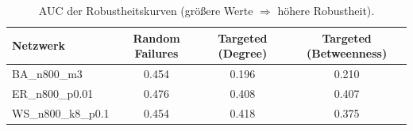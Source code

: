 \begin{table}[htbp]
\centering
\caption{AUC der Robustheitskurven (größere Werte $\Rightarrow$ höhere Robustheit).}
\label{tab:auc_summary}
\begin{tabular}{lccc}
\hline
Netzwerk & Random Failures & Targeted (Degree) & Targeted (Betweenness) \\
\hline
BA\_n800\_m3 & 0.454 & 0.196 & 0.210 \\
ER\_n800\_p0.01 & 0.476 & 0.408 & 0.407 \\
WS\_n800\_k8\_p0.1 & 0.454 & 0.418 & 0.375 \\
\hline
\end{tabular}
\end{table}
